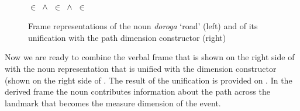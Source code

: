 \begin{figure}\small
\hfill%
\hfill%
\begin{minipage}{0.275\textwidth}
\\
\vspace{0.3em}
 $\in$  $\,\wedge\,$  $\in$  $\,\wedge\,$  $\in$ 
\end{minipage}
\caption{Frame representations of the noun \textit{doroga} `road' (left) and of its unification with the path dimension constructor (right) \label{frame:road}}
\end{figure}

Now we are ready to combine the verbal frame that is shown on the right side of  with the noun representation that is unified with the dimension constructor (shown on the right side of . The result of the unification is provided on . In the derived frame the noun contributes information about the path across the landmark that becomes the measure dimension of the event.

